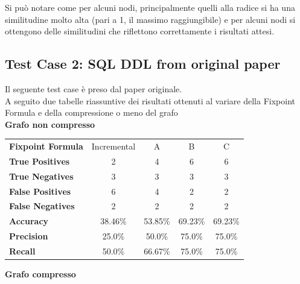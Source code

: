 \documentclass[a4paper,10pt]{article}
\begin{document}
\newpage

Si può notare come per alcuni nodi, principalmente quelli alla radice si ha una similitudine molto alta (pari a 1, il massimo raggiungibile) e per alcuni nodi si ottengono delle similitudini che riflettono correttamente i risultati attesi.\\

\subsection{Test Case 2: SQL DDL from original paper}


Il seguente test case è preso dal paper originale.\\

A seguito due tabelle riassuntive dei risultati ottenuti al variare della Fixpoint Formula e della compressione o meno del grafo\\

\textbf{Grafo non compresso}

\begin{center}
\begin{tabular}{| l | c | c | c | c |}
	\hline
	\textbf{Fixpoint Formula} & Incremental & A & B & C\\
	\hhline{|=|=|=|=|=|}
	\textbf{True Positives} & 2 & 4 & 6 & 6\\
	\hline
	\textbf{True Negatives} & 3 & 3 & 3 & 3\\
	\hline
	\textbf{False Positives} & 6 & 4 & 2 & 2\\
	\hline
	\textbf{False Negatives} & 2 & 2 & 2 & 2\\
	\hline
	\textbf{Accuracy} & 38.46\% & 53.85\% & 69.23\% & 69.23\%\\
	\hline
	\textbf{Precision} & 25.0\% & 50.0\% & 75.0\% & 75.0\%\\
	\hline
	\textbf{Recall} & 50.0\% & 66.67\% & 75.0\% & 75.0\%\\
	\hline
\end{tabular}
\end{center}
\vspace{4mm}

\textbf{Grafo compresso}
\end{document}
